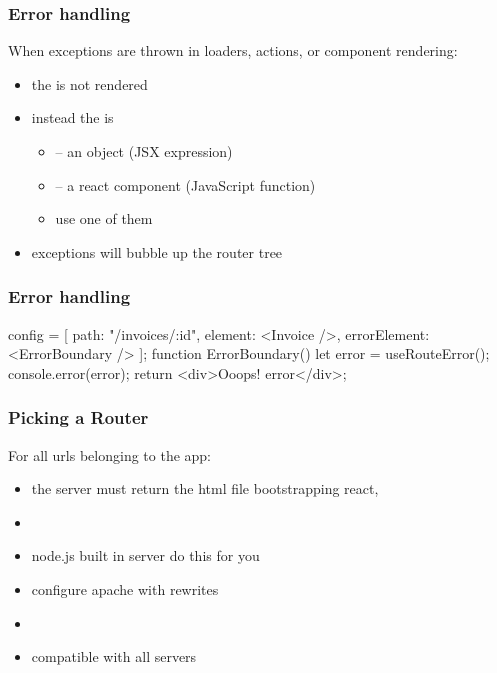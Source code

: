 \begin{frame}[fragile] \frametitle{Error handling}
When exceptions are thrown in loaders, actions, or component rendering:
\begin{itemize}
  \item the  is not rendered
  \item instead the  is
  \begin{itemize}
    \item {} -- an object (JSX expression)
    \item {} -- a react component (JavaScript function)
    \item use one of them
  \end{itemize}
  \item exceptions will bubble up the router tree 
\end{itemize}
\end{frame}
\begin{frame}[fragile] \frametitle{Error handling}
\begin{CodeBox}{}
config = [{
  path: "/invoices/:id",
  element: <Invoice />,
  errorElement: <ErrorBoundary />
}];
function ErrorBoundary() {
  let error = useRouteError();
  console.error(error);
  return <div>Ooops! {error}</div>;
}
\end{CodeBox}
\end{frame}



\begin{frame}[fragile] \frametitle{Picking a Router}

For all urls belonging to the app:
\begin{itemize}
  \item the server must return the html file bootstrapping react,  
\end{itemize}

\begin{itemize}
  \item {}
  \item node.js built in server do this for you
  \item configure apache with rewrites
\end{itemize}

\begin{itemize}
  \item {}
  \item compatible with all servers
\end{itemize}
\end{frame}

